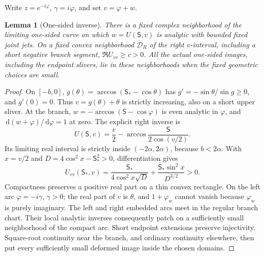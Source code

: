 \documentclass[11pt]{article}
\numberwithin{equation}{section}
\newtheorem{lemma}[theorem]{Lemma}
\theoremstyle{definition}
\newcommand{\dd}{\,\mathrm d}
\begin{document}
Write $z=e^{-i\varphi}$, $\gamma=i\varphi$, and set $v=\varphi+w$.

\begin{lemma}[One-sided inverse]\label{lem:iso-inverse}
There is a fixed complex neighborhood of the limiting one-sided
curve on which $w=U(\mathsf S,v)$ is analytic with bounded fixed
joint jets.  On a fixed convex neighborhood $\mathcal D_R$ of the
right $v$-interval, including a short negative branch segment,
$\Re U_{vv}\ge c>0$.  All the actual one-sided images, including
the endpoint slivers, lie in these neighborhoods when the fixed
geometric choices are small.
\end{lemma}
\begin{proof}
On $[-b,0]$, $g(\theta)=\arccos(\mathsf S_*-\cos\theta)$ has
$g'=-\sin\theta/\sin g\ge0$, and $g'(0)=0$.
Thus $v=g(\theta)+\theta$ is strictly increasing, also on a short
upper sliver.  At the branch,
$w=-\arccos(\mathsf S-\cos\varphi)$ is even analytic in
$\varphi$, and $\dd(w+\varphi)/\dd\varphi=1$ at zero.
The explicit right inverse is
\begin{equation}\label{eq:iso-inverse-explicit}
 U(\mathsf S,v)=\frac v2-
       \arccos\frac{\mathsf S}{2\cos(v/2)}.
\end{equation}
Its limiting real interval is strictly inside $(-2\alpha,2\alpha)$,
because $b<2\alpha$.  With $x=v/2$ and
$D=4\cos^2x-\mathsf S_*^2>0$, differentiation gives
\[
 U_{vv}(\mathsf S_*,v)
 =\frac{\mathsf S_*}{4\cos^2x\sqrt D}
      +\frac{\mathsf S_*\sin^2x}{D^{3/2}}>0.
\]
Compactness preserves a positive real part on a thin convex rectangle.
On the left arc $\varphi=-i\gamma$, $\gamma>0$; the real part of $v$
is $\theta$, and $1+\varphi_w$ cannot vanish because $\varphi_w$
is purely imaginary.  The left and right embedded arcs meet in the
regular branch chart.  Their local analytic inverses consequently
patch on a sufficiently small neighborhood of the compact arc.
Short endpoint extensions preserve injectivity.  Square-root
continuity near the branch, and ordinary continuity elsewhere, then
put every sufficiently small deformed image inside the chosen domains.
\end{proof}
\end{document}
